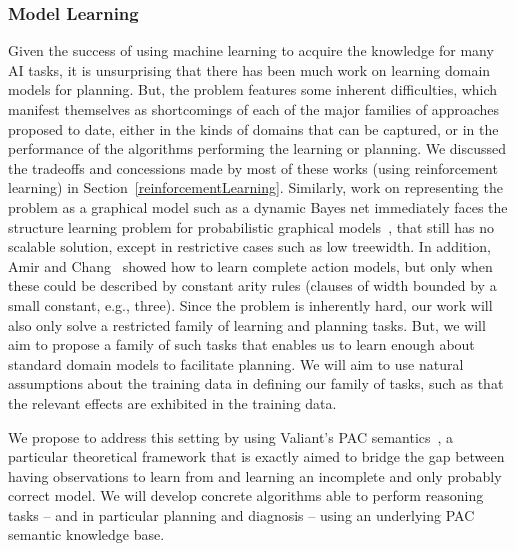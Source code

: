 \documentclass[12pt]{article}
\newcommand{\note}[1]{\textbf{\textit{#1}}}
\begin{document}
\subsubsection{Model Learning}
Given the success of using machine learning to acquire the knowledge for many AI tasks, it is unsurprising that there has been much work on learning domain models for planning. But, the problem features some inherent difficulties, which manifest themselves as shortcomings of each of the major families of approaches proposed to date, either in the kinds of domains that can be captured, or in the performance of the algorithms performing the learning or planning. We discussed the tradeoffs and concessions made by most of these works (using reinforcement learning) in Section~\ref{reinforcementLearning}. Similarly, work on representing the problem as a graphical model such as a dynamic Bayes net immediately faces the structure learning problem for probabilistic graphical models~\cite[Section~19.4]{koller2009pgm}, that still has no scalable solution, except in restrictive cases such as low treewidth. In addition, Amir and Chang~\cite{amir2008} showed how to learn complete action models, but only when these could be described by constant arity rules (clauses of width bounded by a small constant, e.g., three). Since the problem is inherently hard, our work will also only solve a restricted family of learning and planning tasks. But, we will aim to propose a family of such tasks that enables us to learn enough about standard domain models to facilitate planning. We will aim to use natural assumptions about the training data in defining our family of tasks, such as that the relevant effects are exhibited in the training data.



We propose to address this setting by using Valiant's PAC semantics~\cite{valiant2000robustLogics}, a particular theoretical framework that is exactly aimed to bridge the gap between having observations to learn from and learning an incomplete and only probably correct model. We will develop concrete algorithms able to perform reasoning tasks -- and in particular planning and diagnosis -- using an underlying PAC semantic knowledge base. 

\end{document}
